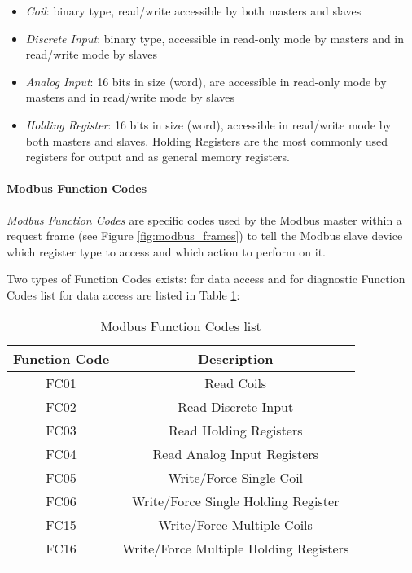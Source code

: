 \begin{itemize}
	\item \textit{Coil}: binary type, read/write accessible by both masters and slaves
	\item \textit{Discrete Input}: binary type, accessible in read-only mode by masters and in read/write mode by slaves
	\item \textit{Analog Input}: 16 bits in size (word), are accessible in read-only mode by masters and in read/write mode by slaves
	\item \textit{Holding Register}:  16 bits in size (word), accessible in read/write mode by both masters and slaves. Holding Registers are the most commonly used registers for output and as general memory registers.
\end{itemize}

\paragraph{Modbus Function Codes}
\label{subsub:modbus_func_codes}
\textit{Modbus Function Codes} are specific codes used by the Modbus master within a request frame (see Figure \ref{fig:modbus_frames}) to tell the Modbus slave device which register type to access and which action to perform on it.

\bigskip
Two types of Function Codes exists: for data access and for diagnostic
Function Codes list for data access are listed in Table \ref{table:modbus_fc_list}:

\bigskip
\begin{longtable}[c]{| c | c |}
	\hline
	\textbf{Function Code} & \textbf{Description} \\ [0.5ex] 
	\hline
	FC01 & Read Coils \\
	\hline 
	FC02 & Read Discrete Input \\
	\hline
	FC03 & Read Holding Registers \\
	\hline
	FC04 & Read Analog Input Registers \\
	\hline
	FC05 & Write/Force Single Coil \\ 
	\hline
	FC06 & Write/Force Single Holding Register \\ 
	\hline 
	FC15 & Write/Force Multiple Coils \\ 
	\hline
	FC16 & Write/Force Multiple Holding Registers \\ 
	\hline
	
	\caption{Modbus Function Codes list}
	\label{table:modbus_fc_list}
\end{longtable}

